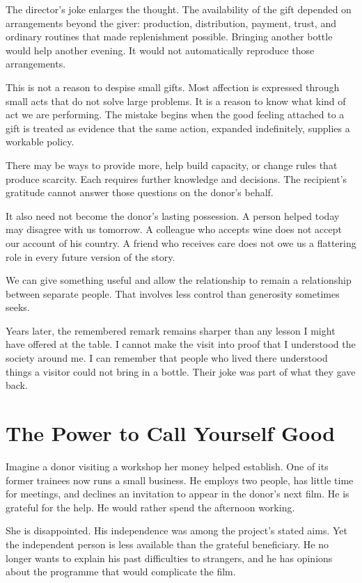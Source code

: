 \documentclass[12pt,a4paper]{book}
\begin{document}
The director's joke enlarges the thought. The availability of the gift depended on arrangements beyond the giver: production, distribution, payment, trust, and ordinary routines that made replenishment possible. Bringing another bottle would help another evening. It would not automatically reproduce those arrangements.

This is not a reason to despise small gifts. Most affection is expressed through small acts that do not solve large problems. It is a reason to know what kind of act we are performing. The mistake begins when the good feeling attached to a gift is treated as evidence that the same action, expanded indefinitely, supplies a workable policy.

There may be ways to provide more, help build capacity, or change rules that produce scarcity. Each requires further knowledge and decisions. The recipient's gratitude cannot answer those questions on the donor's behalf.

It also need not become the donor's lasting possession. A person helped today may disagree with us tomorrow. A colleague who accepts wine does not accept our account of his country. A friend who receives care does not owe us a flattering role in every future version of the story.

We can give something useful and allow the relationship to remain a relationship between separate people. That involves less control than generosity sometimes seeks.

Years later, the remembered remark remains sharper than any lesson I might have offered at the table. I cannot make the visit into proof that I understood the society around me. I can remember that people who lived there understood things a visitor could not bring in a bottle. Their joke was part of what they gave back.

\chapter{The Power to Call Yourself Good}

Imagine a donor visiting a workshop her money helped establish. One of its former trainees now runs a small business. He employs two people, has little time for meetings, and declines an invitation to appear in the donor's next film. He is grateful for the help. He would rather spend the afternoon working.

She is disappointed. His independence was among the project's stated aims. Yet the independent person is less available than the grateful beneficiary. He no longer wants to explain his past difficulties to strangers, and he has opinions about the programme that would complicate the film.
\end{document}
